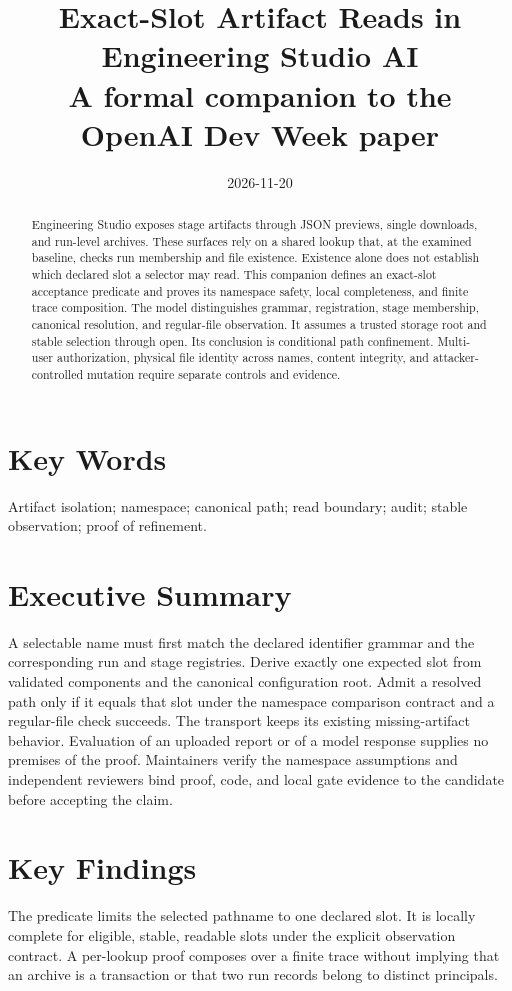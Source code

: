 \documentclass[12pt]{article}
\title{Exact-Slot Artifact Reads in Engineering Studio AI\\
\large A formal companion to the OpenAI Dev Week paper}
\date{2026-11-20}
\begin{document}
\maketitle
\begin{abstract}
Engineering Studio exposes stage artifacts through JSON previews, single
downloads, and run-level archives. These surfaces rely on a shared lookup
that, at the examined baseline, checks run membership and file existence.
Existence alone does not establish which declared slot a selector may
read. This companion defines an exact-slot acceptance predicate and proves
its namespace safety, local completeness, and finite trace composition.
The model distinguishes grammar, registration, stage membership, canonical
resolution, and regular-file observation. It assumes a trusted storage
root and stable selection through open. Its conclusion is conditional
path confinement. Multi-user authorization, physical file identity
across names, content integrity, and attacker-controlled mutation require
separate controls and evidence.
\end{abstract}

\section*{Key Words}
Artifact isolation; namespace; canonical path; read boundary; audit;
stable observation; proof of refinement.

\section*{Executive Summary}
A selectable name must first match the declared identifier grammar and the
corresponding run and stage registries. Derive exactly one expected slot
from validated components and the canonical configuration root. Admit a
resolved path only if it equals that slot under the namespace comparison
contract and a regular-file check succeeds. The transport keeps its
existing missing-artifact behavior. Evaluation of an uploaded report or of
a model response supplies no premises of the proof. Maintainers verify the
namespace assumptions and independent reviewers bind proof, code, and local
gate evidence to the candidate before accepting the claim.

\section*{Key Findings}
The predicate limits the selected pathname to one declared slot. It is
locally complete for eligible, stable, readable slots under the explicit
observation contract. A per-lookup proof composes over a finite trace
without implying that an archive is a transaction or that two run records
belong to distinct principals.
\end{document}
